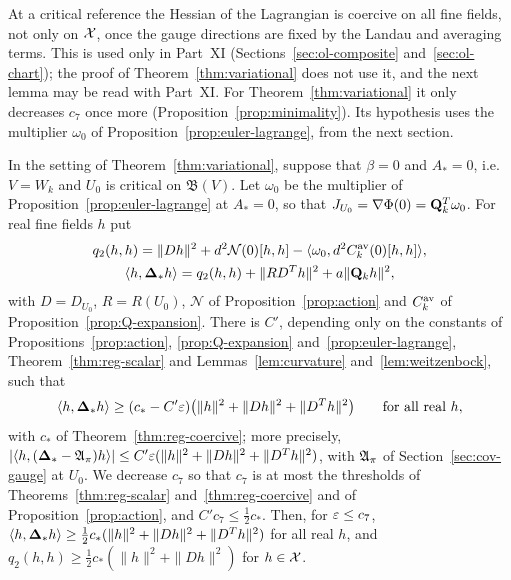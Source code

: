 At a critical reference the Hessian of the Lagrangian is coercive on all fine fields, not only on $\mathcal X$, once the gauge directions are fixed by the Landau and averaging terms. This is used only in Part~XI (Sections~\ref{sec:ol-composite} and~\ref{sec:ol-chart}); the proof of Theorem~\ref{thm:variational} does not use it, and the next lemma may be read with Part~XI. For Theorem~\ref{thm:variational} it only decreases $c_7$ once more (Proposition~\ref{prop:minimality}). Its hypothesis uses the multiplier $\omega_0$ of Proposition~\ref{prop:euler-lagrange}, from the next section.

\begin{lemma}\label{lem:Lstar-coercive}
In the setting of Theorem~\ref{thm:variational}, suppose that $\beta=0$ and $A_*=0$, i.e.\ $V=W_k$ and $U_0$ is critical on $\mathfrak B(V)$. Let $\omega_0$ be the multiplier of Proposition~\ref{prop:euler-lagrange} at $A_*=0$, so that $J_{U_0}=\nabla\Phi(0)=\mathbf Q_k^T\omega_0$. For real fine fields $h$ put
\[
\begin{gathered}
q_2(h,h)=\|Dh\|^2+d^2\mathcal N(0)[h,h]-\langle \omega_0,d^2C^{\rm av}_k(0)[h,h]\rangle,\\
\langle h,\boldsymbol{\Delta}_*h\rangle=q_2(h,h)+\|RD^Th\|^2+a\|\mathbf Q_kh\|^2,
\end{gathered}
\]
with $D=D_{U_0}$, $R=R(U_0)$, $\mathcal N$ of Proposition~\ref{prop:action} and $C^{\rm av}_k$ of Proposition~\ref{prop:Q-expansion}. There is $C'$, depending only on the constants of Propositions~\ref{prop:action}, \ref{prop:Q-expansion} and~\ref{prop:euler-lagrange}, Theorem~\ref{thm:reg-scalar} and Lemmas~\ref{lem:curvature} and~\ref{lem:weitzenbock}, such that
\begin{equation}\label{eq:Lstar-coercive}
\langle h,\boldsymbol{\Delta}_*h\rangle\ge(c_*-C'\varepsilon)\big(\|h\|^2+\|Dh\|^2+\|D^Th\|^2\big)\qquad\text{for all real }h,
\end{equation}
with $c_*$ of Theorem~\ref{thm:reg-coercive}; more precisely, $|\langle h,(\boldsymbol{\Delta}_*-\mathfrak A_\pi)h\rangle|\le C'\varepsilon(\|h\|^2+\|Dh\|^2+\|D^Th\|^2)$, with $\mathfrak A_\pi$ of Section~\ref{sec:cov-gauge} at $U_0$. We decrease $c_7$ so that $c_7$ is at most the thresholds of Theorems~\ref{thm:reg-scalar} and~\ref{thm:reg-coercive} and of Proposition~\ref{prop:action}, and $C'c_7\le\frac12c_*$. Then, for $\varepsilon\le c_7$, $\langle h,\boldsymbol{\Delta}_*h\rangle\ge\frac12c_*(\|h\|^2+\|Dh\|^2+\|D^Th\|^2)$ for all real $h$, and $q_2(h,h)\ge\frac12c_*(\|h\|^2+\|Dh\|^2)$ for $h\in\mathcal X$.
\end{lemma}

